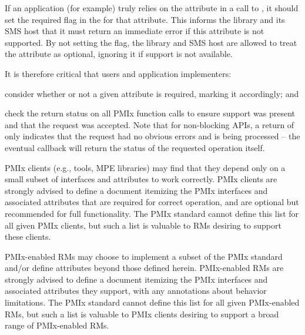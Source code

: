 {%

If an application (for example) truly relies on the  attribute in a call to , it should set the required flag in the  for that attribute. This informs the library and its \ac{SMS} host that it must return an immediate error if this attribute is not supported. By not setting the flag, the library and \ac{SMS} host are allowed to treat the attribute as optional, ignoring it if support is not available.

It is therefore critical that users and application implementers:

\begin{compactalphaenum}
\item consider whether or not a given attribute is required, marking it accordingly; and

\item check the return status on all \ac{PMIx} function calls to ensure support was present and that the request was accepted. Note that for non-blocking \acp{API}, a return of  only indicates that the request had no obvious errors and is being processed – the eventual callback will return the status of the requested operation itself.
\end{compactalphaenum}


\ac{PMIx} clients (e.g., tools, \ac{MPE} libraries) may find that they depend only on a small subset of interfaces and attributes to work correctly.
\ac{PMIx} clients are strongly advised to define a document itemizing the \ac{PMIx} interfaces and associated attributes that are required for correct operation, and are optional but recommended for full functionality.
The \ac{PMIx} standard cannot define this list for all given \ac{PMIx} clients, but such a list is valuable to \acp{RM} desiring to support these clients.

\ac{PMIx}-enabled \acp{RM} may choose to implement a subset of the \ac{PMIx} standard and/or define attributes beyond those defined herein.
\ac{PMIx}-enabled \acp{RM} are strongly advised to define a document itemizing the \ac{PMIx} interfaces and associated attributes they support, with any annotations about behavior limitations.
The \ac{PMIx} standard cannot define this list for all given \ac{PMIx}-enabled \acp{RM}, but such a list is valuable to \ac{PMIx} clients desiring to support a broad range of \ac{PMIx}-enabled \acp{RM}. 

}
